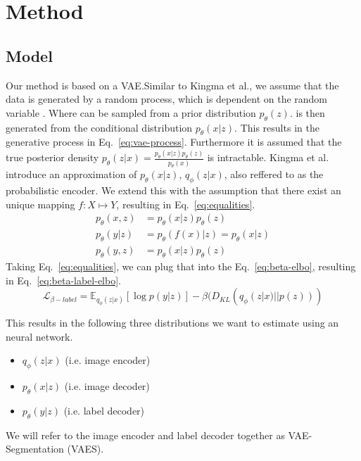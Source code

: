\chapter{Method}\label{chapter:first_real_chapter}

\section{Model}
Our method is based on a VAE\cite{kingma2014autoencodingvariationalbayes}.Similar to Kingma et al., we assume that the data is generated by a random process, which is dependent on the random variable . Where  can be sampled from a prior distribution $p_\theta(z)$.  is then generated from the conditional distribution $p_\theta(x|z)$. This results in the generative process in Eq.~\ref{eq:vae-process}. Furthermore it is assumed that the true posterior density $p_\theta(z|x) = \frac{p_\theta(x|z)p_\theta(z)}{p_\theta(x)}$ is intractable.  Kingma et al. introduce an approximation of $p_\theta(x|z)$, $q_\phi(z|x)$, also reffered to as the probabilistic encoder.
We extend this with the assumption that there exist an unique mapping $f: X \mapsto Y$, resulting in Eq.~\ref{eq:equalities}. 
\begin{subequations}
    \begin{align}
        p_\theta(x, z) & = p_\theta(x|z)p_\theta(z) \label{eq:vae-process}        \\
        p_\theta(y|z)  & = p_\theta(f(x)|z) = p_\theta(x|z) \label{eq:equalities} \\
        p_\theta(y, z) & = p_\theta(x|z)p_\theta(z)\label{eq:label-process}
    \end{align}
\end{subequations}
Taking Eq.~\ref{eq:equalities}, we can plug that into the Eq.~\ref{eq:beta-elbo}, resulting in Eq.~\ref{eq:beta-label-elbo}.
\begin{equation}
    \label{eq:beta-label-elbo}
    \mathcal{L}_{\beta-label} = \mathbb{E}_{q_{\phi}(z|x)}[\log p(y|z)] - \beta (D_{KL}(q_{\phi}(z|x) || p(z)))
\end{equation}


This results in the following three distributions we want to estimate using an neural network.
\begin{itemize}
    \item $q_\phi(z|x)$ (i.e. image encoder)
    \item $p_\theta(x|z)$ (i.e. image decoder)
    \item $p_\theta(y|z)$ (i.e. label decoder)
\end{itemize}
We will refer to the image encoder and label decoder together as VAE-Segmentation (VAES).

